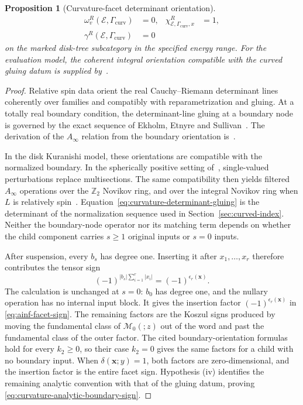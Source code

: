 \documentclass[11pt,letterpaper,twoside]{article}
\theoremstyle{plain}
\newtheorem{proposition}[theorem]{Proposition}
\theoremstyle{definition}
\theoremstyle{remark}
\let\cite\citep
\newcommand{\Ainf}{A_\infty}
\begin{document}
\begin{proposition}[Curvature-facet determinant orientation]
\begin{align}
 \omega^R_v(\mathcal E,\Gamma_{\mathrm{curv}})&=0,
 &\chi^R_{\mathcal E,\Gamma_{\mathrm{curv}},x}&=1,
 \label{eq:curvature-local-orientation-vanishing}\\
 \gamma^R(\mathcal E,\Gamma_{\mathrm{curv}})&=0
 \label{eq:curvature-gluing-holonomy-vanishing}
\end{align}
on the marked disk-tree subcategory in the specified energy range.  For the evaluation model, the coherent integral orientation compatible with the curved gluing datum is supplied by~\cite[Prop.~8.5.1]{fooo2009}.
\end{proposition}

\begin{proof}
Relative spin data orient the real Cauchy--Riemann determinant lines coherently over families and compatibly with reparametrization and gluing.  At a totally real boundary condition, the determinant-line gluing at a boundary node is governed by the exact sequence of Ekholm, Etnyre and Sullivan~\cite[Lem.~3.1]{ekholmetnyresullivan2005}.  The derivation of the \(\Ainf\) relation from the boundary orientation is~\cite[Prop.~8.5.1]{fooo2009}.

In the disk Kuranishi model, these orientations are compatible with the normalized boundary.  In the spherically positive setting of~\cite{fooo2013integers}, single-valued perturbations replace multisections.  The same compatibility then yields filtered $\Ainf$ operations over the $\mathbb Z_2$ Novikov ring, and over the integral Novikov ring when $L$ is relatively spin~\cite{fooo2009,fooo2013integers}.  Equation~\eqref{eq:curvature-determinant-gluing} is the determinant of the normalization sequence used in Section~\ref{sec:curved-index}.  Neither the boundary-node operator nor its matching term depends on whether the child component carries $s\geq1$ original inputs or $s=0$ inputs.

After suspension, every $b_s$ has degree one.  Inserting it after $x_1,\ldots,x_r$ therefore contributes the tensor sign
\[
 (-1)^{|b_s|\sum_{i=1}^r|x_i|}
 =(-1)^{\epsilon_r(\mathbf x)}.
\]
The calculation is unchanged at $s=0$: $b_0$ has degree one, and the nullary operation has no internal input block.  It gives the insertion factor $(-1)^{\epsilon_r(\mathbf x)}$ in \eqref{eq:ainf-facet-sign}.  The remaining factors are the Koszul signs produced by moving the fundamental class of $\mathcal M_0(;z)$ out of the word and past the fundamental class of the outer factor.  The cited boundary-orientation formulas hold for every $k_2\geq0$, so their case $k_2=0$ gives the same factors for a child with no boundary input.  When $\delta(\mathbf x;y)=1$, both factors are zero-dimensional, and the insertion factor is the entire facet sign.  Hypothesis \textup{(iv)} identifies the remaining analytic convention with that of the gluing datum, proving \eqref{eq:curvature-analytic-boundary-sign}.


\end{proof}
\end{document}
